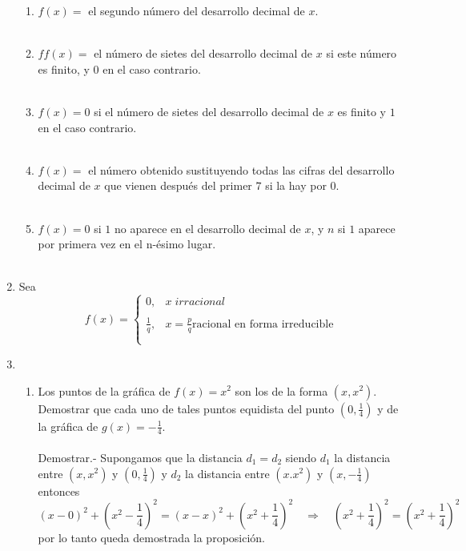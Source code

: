 \begin{enumerate}[\bfseries 1.]
\begin{enumerate}[\bfseries (i)]
	\item $f(x)=$ el segundo número del desarrollo decimal de $x$.\\\\

	\item $ff(x)=$ el número de sietes del desarrollo decimal de $x$ si este número es finito, y $0$ en el caso contrario.\\\\

	\item $f(x)=0$ si el número de sietes del desarrollo decimal de $x$ es finito y $1$ en el caso contrario.\\\\

	\item $f(x)=$ el número obtenido sustituyendo todas las cifras del desarrollo decimal de $x$ que vienen después del primer $7$ si la hay por $0$.\\\\

	\item $f(x)=0$ si $1$ no aparece en el desarrollo decimal de $x$, y $n$ si $1$ aparece por primera vez en el n-ésimo lugar.\\\\
    \end{enumerate}

    \item Sea $$f(x)=\left\{ \begin{array}{rl}
	0,&x \; irracional\\
	\\ \frac{1}{q},& x=\frac{p}{q} \mbox{racional en forma irreducible}\\\\
    \end{array}\right.$$

    \item
    \begin{enumerate}[\bfseries (a)]
	
	\item Los puntos de la gráfica de $f(x)=x^2$ son los de la forma $(x,x^2)$. Demostrar que cada uno de tales puntos equidista del punto $(0,\frac{1}{4})$ y de la gráfica de $g(x)=-\frac{1}{4}$.\\\\
	    Demostrar.-\; Supongamos que la distancia $d_1 = d_2$ siendo $d_1$ la distancia entre $(x,x^2)$ y $(0,\frac{1}{4})$ y $d_2$ la distancia entre $(x.x^2)$ y $(x,-\frac{1}{4})$ entonces $$(x-0)^2+\left(x^2-\frac{1}{4}\right)^2 = (x-x)^2 + \left(x^2+\frac{1}{4}\right)^2 \quad \Rightarrow \quad \left(x^2 + \frac{1}{4}\right)^2 = \left(x^2 + \frac{1}{4}\right)^2$$ por lo tanto queda demostrada la proposición.\\\\


\end{enumerate}
\end{enumerate}
